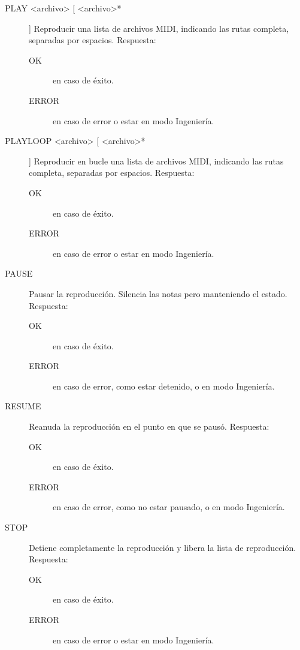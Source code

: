 \begin{description}
	\item[PLAY <archivo> [ <archivo>*]] Reproducir una lista de archivos \acrshort{MIDI}, indicando las rutas completa, separadas por espacios. Respuesta:
	
	\begin{description}
		\item[OK] en caso de éxito.
		\item[ERROR] en caso de error o estar en modo Ingeniería.
	\end{description}
	
	\item[PLAYLOOP <archivo> [ <archivo>* ]] Reproducir en bucle una lista de archivos \acrshort{MIDI}, indicando las rutas completa, separadas por espacios. Respuesta:
	
	\begin{description}
		\item[OK] en caso de éxito.
		\item[ERROR] en caso de error o estar en modo Ingeniería.
	\end{description}
	
	\item[PAUSE] Pausar la reproducción. Silencia las notas pero manteniendo el estado. Respuesta:
	
	\begin{description}
		\item[OK] en caso de éxito.
		\item[ERROR] en caso de error, como estar detenido, o en modo Ingeniería.
	\end{description}
	
	\item[RESUME] Reanuda la reproducción en el punto en que se pausó. Respuesta:
	
	\begin{description}
		\item[OK] en caso de éxito.
		\item[ERROR] en caso de error, como no estar pausado, o en modo Ingeniería.
	\end{description}
	
	\item[STOP] Detiene completamente la reproducción y libera la lista de reproducción. Respuesta:
	
	\begin{description}
		\item[OK] en caso de éxito.
		\item[ERROR] en caso de error o estar en modo Ingeniería.
	\end{description}
	

\end{description}
